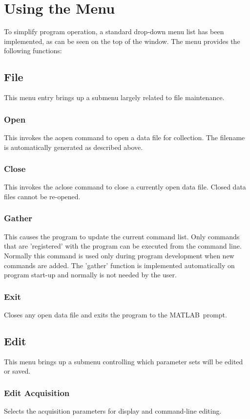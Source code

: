 \documentclass[11pt, letterpaper, titlepage]{paper}
\newcommand{\ml}{\textsf{MATLAB}}
\begin{document}
\section{Using the Menu} To simplify program operation, 
a standard drop-down menu list has been implemented, as can be 
seen on the top of the window. The menu provides the following 
functions:

\subsection{File}
This menu entry brings up a submenu largely related to file 
maintenance.
\subsubsection{Open} This invokes the aopen command to 
open a data file for collection. The filename is automatically 
generated as described above.
\subsubsection{Close} This invokes the aclose command to close a 
currently open data file. Closed data files cannot be re-opened.
\subsubsection{Gather} This causes the program to update the 
current command list. Only commands that are 'registered' with the 
program can be executed from the command line. Normally this 
command is used only during program development when new commands 
are added. The 'gather' function is implemented automatically on 
program start-up and normally is not needed by the user. 
\subsubsection {Exit} Closes any open data file and exits the 
program to the \ml\ prompt.

\subsection{Edit}
This menu brings up a submenu controlling which parameter sets 
will be edited or saved.
\subsubsection{Edit Acquisition} Selects 
the acquisition parameters for display and command-line editing.
\end{document}
